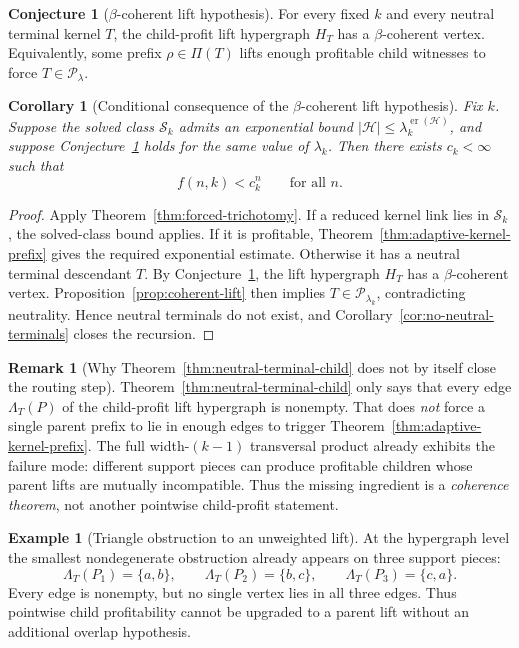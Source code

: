\documentclass[11pt]{article}
\newtheorem{corollary}[theorem]{Corollary}
\theoremstyle{definition}
\newtheorem{example}[theorem]{Example}
\newtheorem{conjecture}[theorem]{Conjecture}
\newtheorem{remark}[theorem]{Remark}
\newcommand{\Hh}{\mathcal{H}}
\newcommand{\er}{\operatorname{er}}
\newcommand{\1}{\mathbf{1}}
\begin{document}
\begin{conjecture}[$\beta$-coherent lift hypothesis]\label{conj:beta-coherent-lift}
For every fixed $k$ and every neutral terminal kernel $T$, the child-profit lift hypergraph $H_T$ has a $\beta$-coherent vertex. Equivalently, some prefix $\rho\in \Pi(T)$ lifts enough profitable child witnesses to force $T\in \mathcal P_\lambda$.
\end{conjecture}

\begin{corollary}[Conditional consequence of the $\beta$-coherent lift hypothesis]\label{cor:beta-coherent-lift}
Fix $k$. Suppose the solved class $\mathcal S_k$ admits an exponential bound $|\Hh|\le \lambda_k^{\er(\Hh)}$, and suppose Conjecture~\ref{conj:beta-coherent-lift} holds for the same value of $\lambda_k$. Then there exists $c_k<\infty$ such that
\[
f(n,k)<c_k^n
\qquad\text{for all }n.
\]
\end{corollary}

\begin{proof}
Apply Theorem~\ref{thm:forced-trichotomy}. If a reduced kernel link lies in $\mathcal S_k$, the solved-class bound applies. If it is profitable, Theorem~\ref{thm:adaptive-kernel-prefix} gives the required exponential estimate. Otherwise it has a neutral terminal descendant $T$. By Conjecture~\ref{conj:beta-coherent-lift}, the lift hypergraph $H_T$ has a $\beta$-coherent vertex. Proposition~\ref{prop:coherent-lift} then implies $T\in \mathcal P_{\lambda_k}$, contradicting neutrality. Hence neutral terminals do not exist, and Corollary~\ref{cor:no-neutral-terminals} closes the recursion.
\end{proof}

\begin{remark}[Why Theorem~\ref{thm:neutral-terminal-child} does not by itself close the routing step]\label{rem:neutral-child-not-enough}
Theorem~\ref{thm:neutral-terminal-child} only says that every edge $\Lambda_T(P)$ of the child-profit lift hypergraph is nonempty. That does \emph{not} force a single parent prefix to lie in enough edges to trigger Theorem~\ref{thm:adaptive-kernel-prefix}. The full width-$(k-1)$ transversal product already exhibits the failure mode: different support pieces can produce profitable children whose parent lifts are mutually incompatible. Thus the missing ingredient is a \emph{coherence theorem}, not another pointwise child-profit statement.
\end{remark}

\begin{example}[Triangle obstruction to an unweighted lift]
At the hypergraph level the smallest nondegenerate obstruction already appears on three support pieces:
\[
\Lambda_T(P_1)=\{a,b\},\qquad
\Lambda_T(P_2)=\{b,c\},\qquad
\Lambda_T(P_3)=\{c,a\}.
\]
Every edge is nonempty, but no single vertex lies in all three edges. Thus pointwise child profitability cannot be upgraded to a parent lift without an additional overlap hypothesis.
\end{example}
\end{document}
